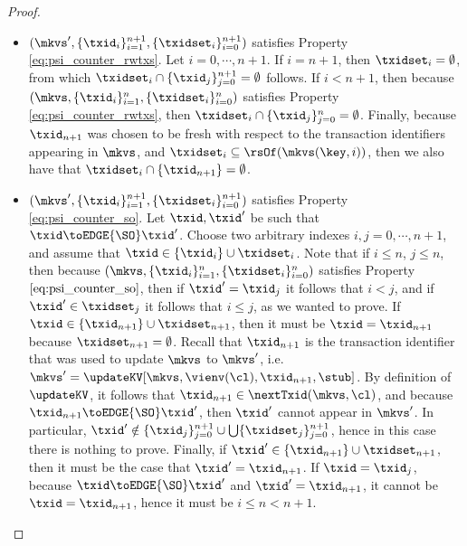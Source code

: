 \begin{proof}
\begin{itemize}
\begin{itemize}
\item $(\mkvs', \{\txid_{i}\}_{i=1}^{n+1}, \{\txidset_{i}\}_{i=0}^{n+1})$ 
satisfies Property \eqref{eq:psi_counter_rwtxs}. Let $i =0, \cdots, n+1$. If $i = n+1$, then 
$\txidset_{i} = \emptyset$, from which $\txidset_{i} \cap \{\txid_{j}\}_{j=0}^{n+1} = \emptyset$ follows. If $i < n+1$, then 
because $(\mkvs, \{\txid_{i}\}_{i=1}^{n}, \{\txidset_{i}\}_{i=0}^{n})$ 
satisfies Property \eqref{eq:psi_counter_rwtxs}, then $\txidset_{i} \cap \{\txid_{j}\}_{j=0}^{n} = \emptyset$. 
Finally, because $\txid_{n+1}$ was chosen to be fresh with respect to the transaction identifiers appearing in 
$\mkvs$, and $\txidset_{i} \subseteq \rsOf(\mkvs(\key, i))$, then  we also have that $\txidset_{i} \cap \{\txid_{n+1}\} = \emptyset$. 
\item $(\mkvs', \{\txid_{i}\}_{i=1}^{n+1}, \{\txidset_{i}\}_{i=0}^{n+1})$ satisfies Property \eqref{eq:psi_counter_so}. Let 
$\txid, \txid'$ be such that $\txid \toEDGE{\SO} \txid'$. Choose two arbitrary indexes $i,j=0,\cdots, n+1$, 
and assume that $\txid \in \{\txid_{i}\} \cup \txidset_{i}$. Note that if $i \leq n$, $j \leq n$, then 
because $(\mkvs, \{\txid_{i}\}_{i=1}^{n}, \{\txidset_{i}\}_{i=0}^{n})$ satisfies Property $\eqref{eq:psi_counter_so}$, then 
if $\txid' = \txid_{j}$ it follows that $i < j$, and if $\txid' \in \txidset_{j}$ it follows that $i \leq j$, as 
we wanted to prove. 
If $\txid \in \{\txid_{n+1}\} \cup \txidset_{n+1}$, then it must be $\txid = \txid_{n+1}$ because 
$\txidset_{n+1} = \emptyset$. Recall that $\txid_{n+1}$ is the transaction identifier that was used 
to update $\mkvs$ to $\mkvs'$, i.e. $\mkvs' = \updateKV[\mkvs, \vienv(\cl), \txid_{n+1}, \stub]$. By 
definition of $\updateKV$, it follows that $\txid_{n+1} \in \nextTxid(\mkvs, \cl)$, 
and because $\txid_{n+1} \toEDGE{\SO} \txid'$, then $\txid'$ cannot appear in $\mkvs'$. 
In particular, 
$\txid' \notin \{\txid_{j}\}_{j=0}^{n+1} \cup \bigcup \{\txidset_{j}\}_{j=0}^{n+1}$, hence in this case there is nothing to prove. 
Finally, if $\txid' \in \{\txid_{n+1}\} \cup \txidset_{n+1}$, then 
it must be the case that $\txid' = \txid_{n+1}$. If $\txid = \txid_{j}$, because 
$\txid \toEDGE{\SO} \txid'$ and $\txid' = \txid_{n+1}$, it cannot be $\txid = \txid_{n+1}$, 
hence it must be $i \leq n < n+1$. 

\end{itemize}
\end{itemize}
\end{proof}
